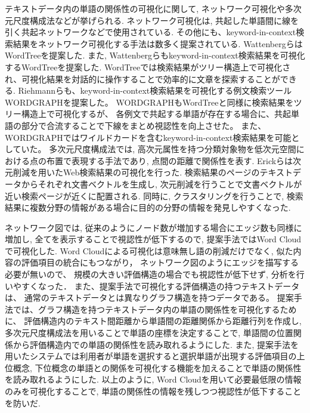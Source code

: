 \documentclass[syuuron]{kuee}
\begin{document}
		テキストデータ内の単語の関係性の可視化に関して, ネットワーク可視化や多次元尺度構成法などが挙げられる. 
		ネットワーク可視化は, 共起した単語間に線を引く共起ネットワークなどで使用されている. 
		その他にも、keyword-in-context検索結果をネットワーク可視化する手法は数多く提案されている. 
		WattenbergらはWordTreeを提案した\cite{wt1}. 
		また, Wattenbergらもkeyword-in-context検索結果を可視化するWordTreeを提案した\cite{wt1}. 
		WordTreeでは検索結果がツリー構造上で可視化され、可視化結果を対話的に操作することで効率的に文章を探索することができる.
		Riehmannらも、keyword-in-context検索結果を可視化する例文検索ツールWORDGRAPHを提案した\cite{wg1}。
		WORDGRAPHもWordTreeと同様に検索結果をツリー構造上で可視化するが、
		各例文で共起する単語が存在する場合に、共起単語の部分で合流することで下線をまとめ視認性を向上させた。
		また、WORDGRAPHではワイルドカードを含むkeyword-in-context検索結果を可能としていた。		
		多次元尺度構成法では, 高次元属性を持つ分類対象物を低次元空間における点の布置で表現する手法であり, 点間の距離で関係性を表す. 
		Erickらは次元削減を用いたWeb検索結果の可視化を行った\cite{or1}. 
		検索結果のページのテキストデータからそれぞれ文書ベクトルを生成し, 次元削減を行うことで文書ベクトルが近い検索ページが近くに配置される. 
		同時に, クラスタリングを行うことで, 検索結果に複数分野の情報がある場合に目的の分野の情報を発見しやすくなった. 
		
		ネットワーク図では, 従来のようにノード数が増加する場合にエッジ数も同様に増加し, 全てを表示することで視認性が低下するので, 
		提案手法ではWord Cloudで可視化した. 
		Word Cloudによる可視化は意味無し語の削減だけでなく, 似た内容の評価項目の統合にもつながり，
		ネットワーク図のようにエッジを描写する必要が無いので、
		規模の大きい評価構造の場合でも視認性が低下せず, 分析を行いやすくなった．
		また、提案手法で可視化する評価構造の持つテキストデータは、
		通常のテキストデータとは異なりグラフ構造を持つデータである。
		提案手法では、グラフ構造を持つテキストデータ内の単語の関係性を可視化するために、
		評価構造内のテキスト間距離から単語間の距離関係から距離行列を作成し, 
		多次元尺度構成法を用いることで単語の座標を決定することで, 単語間の位置関係から評価構造内での単語の関係性を読み取れるようにした. 
		また, 提案手法を用いたシステムでは利用者が単語を選択すると選択単語が出現する評価項目の上位概念, 
		下位概念の単語との関係を可視化する機能を加えることで単語の関係性を読み取れるようにした.
		以上のように, Word Cloudを用いて必要最低限の情報のみを可視化することで, 単語の関係性の情報を残しつつ視認性が低下することを防いだ. 
		
\end{document}
